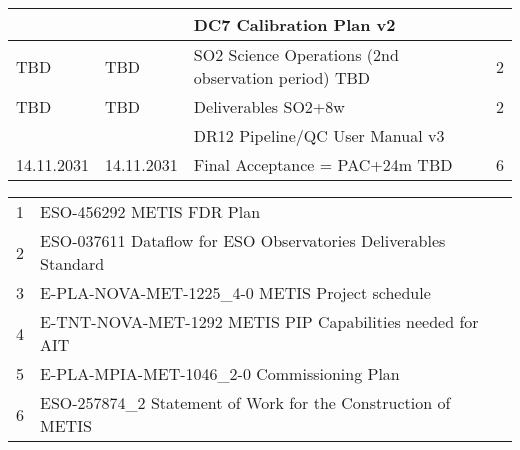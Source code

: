 \begin{table}
\begin{tabularx}{\textwidth}{llll}
	   &		   &	DC7 Calibration Plan v2					    &	\\
\hline
TBD        &	TBD        &	SO2 Science Operations (2nd observation period) TBD	    &	2 \\
\hline
TBD        &	TBD        &	Deliverables SO2+8w                                         &	2 \\
	   &		   &	DR12 Pipeline/QC User Manual v3				    &	\\
\hline
14.11.2031 &	14.11.2031 &	Final Acceptance  = PAC+24m  TBD			    &	6 \\
\hline\hline
\end{tabularx}			
\tiny
\begin{tabularx}{\textwidth}{ll}
1 & ESO-456292 METIS FDR Plan  \\
2 & ESO-037611 Dataflow for ESO Observatories Deliverables Standard \\
3 & E-PLA-NOVA-MET-1225_4-0 METIS Project schedule \\
4 & E-TNT-NOVA-MET-1292 METIS PIP Capabilities needed for AIT \\ 
5 & E-PLA-MPIA-MET-1046_2-0 Commissioning Plan \\
6 & ESO-257874_2 Statement of Work for the Construction of METIS \\
\end{tabularx} 



\end{table}

